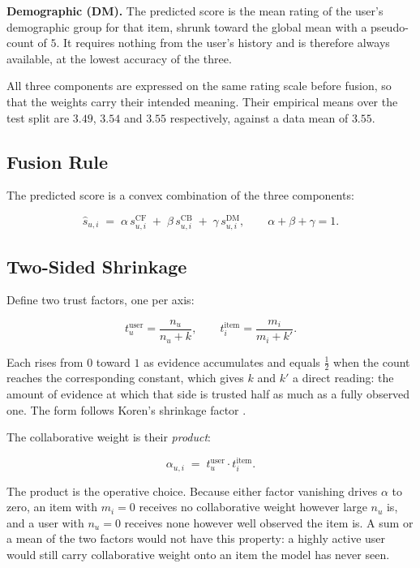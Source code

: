 \documentclass[conference]{IEEEtran}
\begin{document}
\textbf{Demographic (DM).} The predicted score is the mean rating of
the user's demographic group for that item, shrunk toward the global
mean with a pseudo-count of $5$. It requires nothing from the user's
history and is therefore always available, at the lowest accuracy of
the three.

All three components are expressed on the same rating scale before
fusion, so that the weights carry their intended meaning. Their
empirical means over the test split are $3.49$, $3.54$ and $3.55$
respectively, against a data mean of $3.55$.

\subsection{Fusion Rule}

The predicted score is a convex combination of the three components:

\begin{equation}
\hat{s}_{u,i} \;=\; \alpha\, s^{\mathrm{CF}}_{u,i}
                 \;+\; \beta \, s^{\mathrm{CB}}_{u,i}
                 \;+\; \gamma\, s^{\mathrm{DM}}_{u,i},
\qquad
\alpha + \beta + \gamma = 1 .
\label{eq:fusion}
\end{equation}

\subsection{Two-Sided Shrinkage}

Define two trust factors, one per axis:

\begin{equation}
t^{\mathrm{user}}_u = \frac{n_u}{n_u + k}, \qquad
t^{\mathrm{item}}_i = \frac{m_i}{m_i + k'} .
\label{eq:trust}
\end{equation}

Each rises from $0$ toward $1$ as evidence accumulates and equals
$\tfrac{1}{2}$ when the count reaches the corresponding constant,
which gives $k$ and $k'$ a direct reading: the amount of evidence at
which that side is trusted half as much as a fully observed one. The
form follows Koren's shrinkage factor \cite{koren2008}.

The collaborative weight is their \emph{product}:

\begin{equation}
\alpha_{u,i} \;=\; t^{\mathrm{user}}_u \cdot t^{\mathrm{item}}_i .
\label{eq:alpha}
\end{equation}

The product is the operative choice. Because either factor vanishing
drives $\alpha$ to zero, an item with $m_i = 0$ receives no
collaborative weight however large $n_u$ is, and a user with
$n_u = 0$ receives none however well observed the item is. A sum or
a mean of the two factors would not have this property: a highly
active user would still carry collaborative weight onto an item the
model has never seen.
\end{document}
